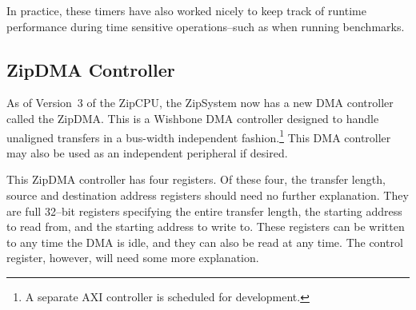 \documentclass{gqtekspec}
\begin{document}
In practice, these timers have also worked nicely to keep track of runtime
performance during time sensitive operations--such as when running benchmarks.

\subsection{ZipDMA Controller}\label{sec:reg-dmac}

As of  Version~3 of the ZipCPU, the ZipSystem now has a new DMA controller
called the ZipDMA.  This is a Wishbone DMA controller designed to handle
unaligned transfers in a bus-width independent fashion.\footnote{A separate
AXI controller is scheduled for development.}  This DMA controller
may also be used as an independent peripheral if desired.

This ZipDMA controller has four registers.  Of these four, the transfer length,
source and destination address registers should need no further explanation.
They are full 32--bit registers specifying the entire transfer length, the
starting address to read from, and the starting address to write to.  These
registers can be written to any time the DMA is idle, and they can also be read
at any time.  The control register, however, will need some more explanation.
\end{document}
